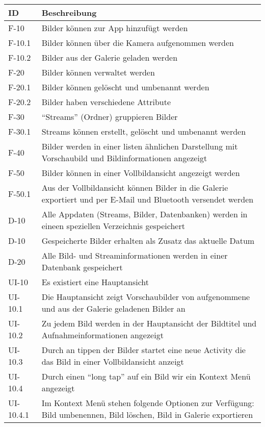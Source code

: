 \begin{center}
\begin{longtable}{|l|p{12cm}|}
\toprule
\textbf{ID} & \textbf{Beschreibung} \\
\hline
\endhead
\hline
\endfoot
F-10 & Bilder können zur App hinzufügt werden\\
F-10.1 & Bilder können über die Kamera aufgenommen werden\\
F-10.2 & Bilder aus der Galerie geladen werden\\
F-20 & Bilder können verwaltet werden\\
F-20.1 & Bilder können gelöscht und umbenannt werden\\
F-20.2 & Bilder haben verschiedene Attribute\\
F-30 & \enquote{Streams} (Ordner) gruppieren Bilder\\
F-30.1 & Streams können erstellt, gelöscht und umbenannt werden\\
F-40 & Bilder werden in einer listen ähnlichen Darstellung mit Vorschaubild und Bildinformationen angezeigt\\
F-50 & Bilder können in einer Vollbildansicht angezeigt werden\\
F-50.1 & Aus der Vollbildansicht können Bilder in die Galerie exportiert und per E-Mail und Bluetooth versendet werden\\
\hline
D-10 & Alle Appdaten (Streams, Bilder, Datenbanken) werden in eineen speziellen Verzeichnis gespeichert\\
D-10 & Gespeicherte Bilder erhalten als Zusatz das aktuelle Datum\\
D-20 & Alle Bild- und Streaminformationen werden in einer Datenbank gespeichert\\
\hline
UI-10 &  Es existiert eine Hauptansicht\\
UI-10.1 &  Die Hauptansicht zeigt Vorschaubilder von aufgenommene und aus der Galerie geladenen Bilder an\\
UI-10.2 &  Zu jedem Bild werden in der Hauptansicht der Bildtitel und Aufnahmeinformationen angezeigt\\
UI-10.3 &  Durch an tippen der Bilder startet eine neue Activity die das Bild in einer Vollbildansicht anzeigt\\
UI-10.4 &  Durch einen \enquote{long tap} auf ein Bild wir ein Kontext Menü angezeigt\\
UI-10.4.1 & Im Kontext Menü stehen folgende Optionen zur Verfügung: Bild umbenennen, Bild löschen, Bild in Galerie exportieren\\

\end{longtable}
\end{center}
